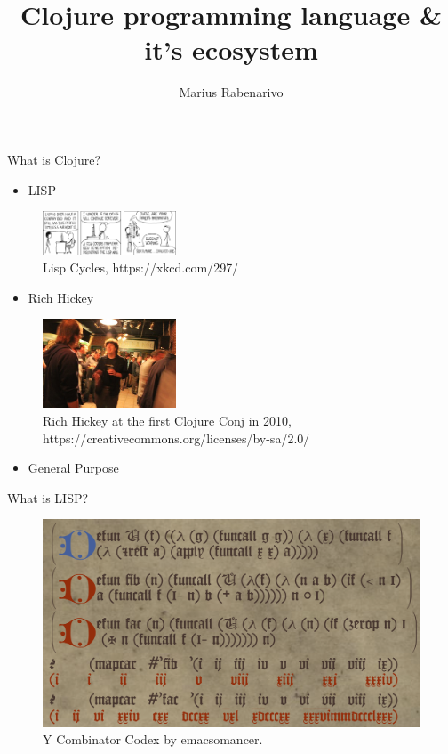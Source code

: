 \documentclass[ignorenonframetext,]{beamer}
\title{Clojure programming language \& it's ecosystem}
\author{Marius Rabenarivo}
\date{}
\providecommand{\tightlist}{%
  \setlength{\itemsep}{0pt}\setlength{\parskip}{0pt}}
\begin{document}
\frame{\titlepage}

\begin{frame}{What is Clojure?}
\protect\hypertarget{what-is-clojure}{}

\begin{itemize}
\tightlist
\item
  LISP
\end{itemize}

\begin{figure}
\centering
\includegraphics[width=1.5625in,height=\textheight]{lisp_cycles.png}
\caption{Lisp Cycles, https://xkcd.com/297/}
\end{figure}

\begin{itemize}
\tightlist
\item
  Rich Hickey
\end{itemize}

\begin{figure}
\centering
\includegraphics[width=1.5625in,height=\textheight]{rich-hickey-clojure-conj-2010.jpg}
\caption{Rich Hickey at the first Clojure Conj in 2010,
https://creativecommons.org/licenses/by-sa/2.0/}
\end{figure}

\begin{itemize}
\tightlist
\item
  General Purpose
\end{itemize}

\end{frame}

\begin{frame}{What is LISP?}
\protect\hypertarget{what-is-lisp}{}

\begin{figure}
\centering
\includegraphics{ycombinator-codex_banner.png}
\caption{Y Combinator Codex by emacsomancer.}
\end{figure}

\end{frame}
\end{document}
